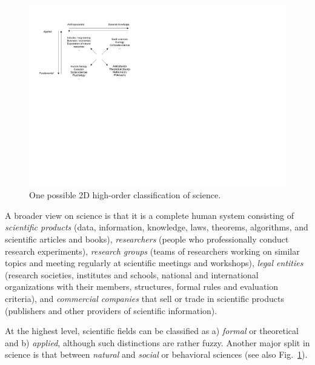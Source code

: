 \documentclass[graybox,envcountchap,sectrefs,UStrade]{svmono}
\begin{document}
\begin{figure}[!hbt]
\begin{center}
\includegraphics[width=.9\textwidth]{Fig_science_fields.pdf}
\caption{One possible 2D high-order classification of science.}
\label{Fig:science_fields}
\end{center}
\end{figure}


A broader view on science is that it is a complete human system consisting of \emph{scientific products} (data, information, knowledge, laws, theorems, algorithms, and scientific articles and books), \emph{researchers} (people who professionally conduct research experiments), \emph{research groups} (teams of researchers working on similar topics and meeting regularly at scientific meetings and workshops), \emph{legal entities} (research societies, institutes and schools, national and international organizations with their members, structures, formal rules and evaluation criteria), and \emph{commercial companies} that sell or trade in scientific products (publishers and other providers of scientific information). \par

At the highest level, scientific fields can be classified as a) \emph{formal} or theoretical and b) \emph{applied}, although such distinctions are rather fuzzy. Another major split in science is that between \emph{natural} and \emph{social} or behavioral sciences (see also Fig.\@~\ref{Fig:science_fields}).\par
\end{document}
